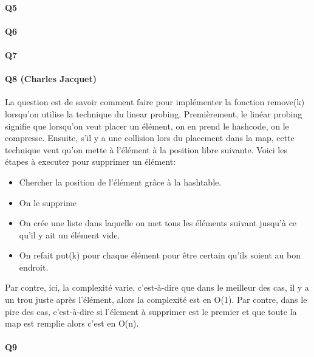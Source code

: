 \documentclass[a4paper]{article}
\begin{document}
\paragraph{Q5}

\paragraph{Q6}

\paragraph{Q7}

\paragraph{Q8 (Charles Jacquet)}
La question est de savoir comment faire pour implémenter la fonction remove(k) lorsqu'on utilise la technique du linear probing. Premièrement, le linéar probing signifie que lorsqu'on veut placer un élément, on en prend le hashcode, on le compresse. Ensuite, s'il y a une collision lors du placement dans la map, cette technique veut qu'on mette à l'élément à la position libre suivante. Voici les étapes à executer pour supprimer un élément:
\begin{itemize}
\item Chercher la position de l'élément grâce à la hashtable.
\item On le supprime
\item On crée une liste dans laquelle on met tous les éléments suivant jusqu'à ce qu'il y ait un élément vide.
\item On refait put(k) pour chaque élément pour être certain qu'ils soient au bon endroit.
\end{itemize}

Par contre, ici, la complexité varie, c'est-à-dire que dans le meilleur des cas, il y a un trou juste après l'élément, alors la complexité est en O(1). Par contre, dans le pire des cas, c'est-à-dire si l'élement à supprimer est le premier et que toute la map est remplie alors c'est en O(n).

\paragraph{Q9}
\end{document}
